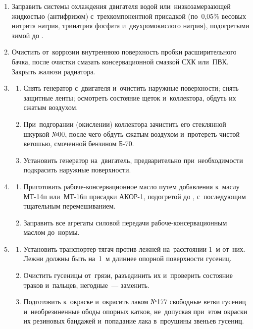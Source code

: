 \begin{enumerate}
    \item
    Заправить системы охлаждения двигателя водой или~низкозамерзающей жидкостью (антифризом) с~трехкомпонентной присадкой (по~0,05\% весовых нитрита натрия, тринатрия фосфата и~двухромокислого натрия), подогретыми зимой до . 

    \item
    Очистить от~коррозии внутреннюю поверхность пробки расширительного бачка, после очистки смазать консервационной смазкой СХК или~ПВК. Закрыть жалюзи радиатора. 

    \item \begin{enumerate}
        \item 
        Снять генератор с~двигателя и~очистить наружные поверхности; снять защитные ленты; осмотреть состояние щеток и~коллектора, обдуть их сжатым воздухом. 
        \item 
        При~подгорании (окислении) коллектора зачистить его стеклянной шкуркой №00, после чего обдуть сжатым воздухом и~протереть чистой ветошью, смоченной бензином Б-70. 
        \item 
        Установить генератор на~двигатель, предварительно при~необходимости подкрасить наружные поверхности. 
    \end{enumerate}

    \item \begin{enumerate}
        \item 
        Приготовить рабоче-консервационное масло путем добавления к~маслу МТ-14п или~МТ-16п присадки АКОР-1, подогретой до \celc{}, с~последующим тщательным перемешиванием. 
        \item 
        Заправить все агрегаты силовой передачи рабоче-консервационным маслом до~нормы. 
    \end{enumerate}

    \item \begin{enumerate}
        \item 
        Установить транспортер-тягач против лежней на~расстоянии 1~м от~них. Лежни должны быть на~1~м длиннее опорной поверхности гусениц. 
        \item 
        Очистить гусеницы от~грязи, разъединить их и~проверить состояние траков и~пальцев, негодные~--- заменить. 
        \item 
        Подготовить к~окраске и~окрасить лаком №177 свободные ветви гусениц и~необрезиненные ободы опорных катков, не~допуская при~этом окраски их резиновых бандажей и~попадание лака в~проушины звеньев гусениц. 


\end{enumerate}
\end{enumerate}
